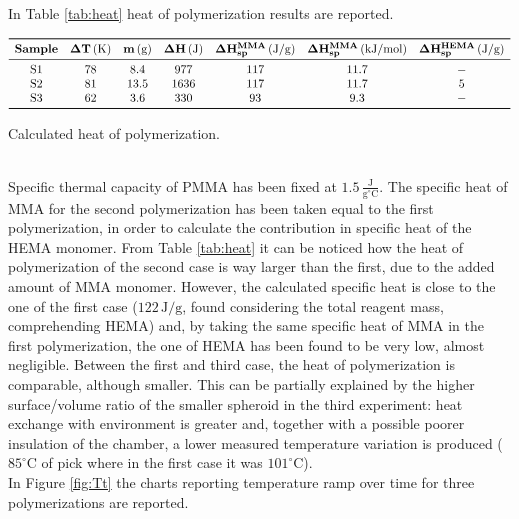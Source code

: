\documentclass[a4paper, 11pt]{article}
\begin{document}
In Table \ref{tab:heat} heat of polymerization results are reported. 
\begin{table}[htp]
\centering
$
\begin{array}{ccccccc}
\toprule
\textbf{Sample} & \mathbf{\Delta T}\,(\text{K}) &  \mathbf{m}\,(\text{g}) & \mathbf{\Delta H}\,(\text{J}) & \mathbf{\Delta H_{sp}^{MMA}}\,(\text{J}/\text{g}) & \mathbf{\Delta H_{sp}^{MMA}}\,(\text{kJ}/\text{mol}) & \mathbf{\Delta H_{sp}^{HEMA}}\,(\text{J}/\text{g}) \\
\midrule
\text{S1} & 78 & 8.4 & 977 & 117 & 11.7 & -\\
\text{S2} & 81 & 13.5 & 1636 & 117 & 11.7 & 5 \\
\text{S3} & 62 & 3.6 & 330 & 93 & 9.3 & - \\
\bottomrule
\end{array}
$
\caption{Calculated heat of polymerization.}
\label{tab:heat}
\end{table}\\
Specific thermal capacity of PMMA has been fixed at $1.5 \,\frac{\text{J}}{\text{g}^\circ\text{C}}$.
The specific heat of MMA for the second polymerization has been taken equal to the first polymerization, in order to calculate the contribution in specific heat of the HEMA monomer. From Table \ref{tab:heat} it can be noticed how the heat of polymerization of the second case is way larger than the first, due to the added amount of MMA monomer. However, the calculated specific heat is close to the one of the first case ($122\,\text{J}/\text{g}$, found considering the total reagent mass, comprehending HEMA) and, by taking the same specific heat of MMA in the first polymerization, the one of HEMA has been found to be very low, almost negligible. Between the first and third case, the heat of polymerization is comparable, although smaller. This can be partially explained by the higher surface/volume ratio of the smaller spheroid in the third experiment: heat exchange with environment is greater and, together with a possible poorer insulation of the chamber, a lower measured temperature variation is produced ($85^\circ$C of pick where in the first case it was $101^\circ$C). \\
In Figure \ref{fig:Tt} the charts reporting temperature ramp over time for three polymerizations are reported. 
\end{document}
